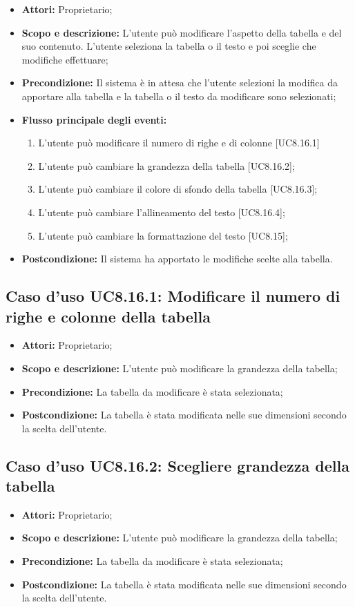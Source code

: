 \begin{itemize}
	\item \textbf{Attori:} Proprietario;
	\item \textbf{Scopo e descrizione:} L'utente può modificare l'aspetto della tabella e del suo contenuto. L'utente seleziona la tabella o il testo e poi sceglie che modifiche effettuare;
	\item \textbf{Precondizione:} Il sistema è in attesa che l'utente selezioni la modifica da apportare alla tabella e la tabella o il testo da modificare sono selezionati;
	\item \textbf{Flusso principale degli eventi:}
	\begin{enumerate}
		\item L'utente può modificare il numero di righe e di colonne [UC8.16.1]
		\item L'utente può cambiare la grandezza della tabella [UC8.16.2];
		\item L'utente può cambiare il colore di sfondo della tabella [UC8.16.3];
		\item L'utente può cambiare l'allineamento del testo [UC8.16.4];
		\item L'utente può cambiare la formattazione del testo [UC8.15];
	\end{enumerate}
	\item \textbf{Postcondizione:} Il sistema ha apportato le modifiche scelte alla tabella.
\end{itemize}

\subsection{Caso d'uso UC8.16.1: Modificare il numero di righe e colonne della tabella}
\begin{itemize}
	\item \textbf{Attori:} Proprietario;
	\item \textbf{Scopo e descrizione:} L'utente può modificare la grandezza della tabella;
	\item \textbf{Precondizione:} La tabella da modificare è stata selezionata;
	\item \textbf{Postcondizione:} La tabella è stata modificata nelle sue dimensioni secondo la scelta dell'utente.
\end{itemize}

\subsection{Caso d'uso UC8.16.2: Scegliere grandezza della tabella}
\begin{itemize}
	\item \textbf{Attori:} Proprietario;
	\item \textbf{Scopo e descrizione:} L'utente può modificare la grandezza della tabella;
	\item \textbf{Precondizione:} La tabella da modificare è stata selezionata;
	\item \textbf{Postcondizione:} La tabella è stata modificata nelle sue dimensioni secondo la scelta dell'utente.
\end{itemize}

